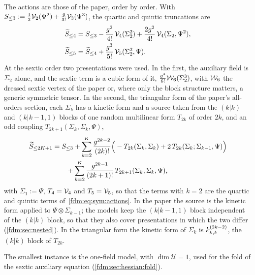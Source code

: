 The actions are those of the paper, order by order.
With $S_{\le 3} := \tfrac12 \vertex{2}(\Psi^2) + \tfrac{g}{3!} \vertex{3}(\Psi^3)$, the quartic and quintic truncations are
\begin{subequations}
  \label{fdm:eq:sym:actions}
  \begin{align}
    \caction[\le 4]
      &
      = S_{\le 3}
        - \frac{g^2}{4!} \, \vertex{4}(\Sigma_2^2)
        + \frac{2 g^2}{4!} \, \vertex{4}(\Sigma_2, \Psi^2),
    \\
    \caction[\le 5]
      &
      = \caction[\le 4]
        + \frac{g^3}{5!} \, \vertex{5}(\Sigma_2^2, \Psi).
  \end{align}
\end{subequations}
At the sextic order two presentations were used.
In the first, the auxiliary field is $\Sigma_2$ alone, and the sextic term is a cubic form of it, $\tfrac{g^4}{6!} \dvertex{6}(\Sigma_2^3)$, with $\dvertex{6}$ the dressed sextic vertex of the paper or, where only the block structure matters, a generic symmetric tensor.
In the second, the triangular form of the paper's all-orders section, each $\Sigma_k$ has a kinetic form and a source taken from the $(k \vert k)$ and $(k \vert k - 1, 1)$ blocks of one random multilinear form $T_{2k}$ of order $2k$, and an odd coupling $T_{2k+1}(\Sigma_k, \Sigma_k, \Psi)$,
\begin{align}
  \label{fdm:eq:sym:tower}
  \caction[\le 2 K + 1]
    &
    = S_{\le 3}
      + \sum_{k = 2}^{K} \frac{g^{2 k - 2}}{(2 k)!} \Big(
        - T_{2k}(\Sigma_k, \Sigma_k)
        + 2 \, T_{2k}(\Sigma_k; \Sigma_{k - 1}, \Psi)
      \Big)
  \nonumber
  \\
    &
    \qquad
      + \sum_{k = 2}^{K} \frac{g^{2 k - 1}}{(2 k + 1)!} \, T_{2k+1}(\Sigma_k, \Sigma_k, \Psi),
\end{align}
with $\Sigma_1 := \Psi$, $T_4 = \vertex{4}$ and $T_5 = \vertex{5}$, so that the terms with $k = 2$ are the quartic and quintic terms of~\eqref{fdm:eq:sym:actions}.
In the paper the source is the kinetic form applied to $\Psi \otimes \Sigma_{k - 1}$; the models keep the $(k \vert k - 1, 1)$ block independent of the $(k \vert k)$ block, so that they also cover presentations in which the two differ (\cref{fdm:sec:nested}).
In the triangular form the kinetic form of $\Sigma_k$ is $\kin{k}{}{2 k - 2}$, the $(k \vert k)$ block of $T_{2k}$.

The smallest instance is the one-field model, with $\dim \mathcal U = 1$, used for the fold of the sextic auxiliary equation (\cref{fdm:sec:hessian:fold}).

